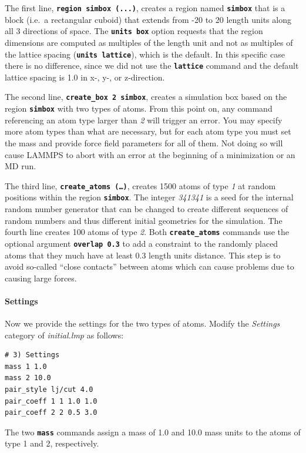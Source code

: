 \documentclass[9pt,tutorial]{livecoms}
\newcommand{\lmpcmd}[1]{\texttt{\normalsize\bfseries\textcolor{command}{#1}}}
\begin{document}
The first line, \lmpcmd{region simbox (...)}, creates a region
named \lmpcmd{simbox} that is a block (i.e.~a rectangular
cuboid) that extends from -20 to 20 length units along all 3 directions
of space.  The \lmpcmd{units box} option requests that the region
dimensions are computed as multiples of the length unit and not as
multiples of the lattice spacing (\lmpcmd{units lattice}), which is the
default.  In this specific case there is no difference, since we did not
use the \lmpcmd{lattice} command and the default lattice spacing is 1.0
in x-, y-, or z-direction.

The second line, \lmpcmd{create\_box 2 simbox}, creates a
simulation box based on the region \lmpcmd{simbox} with two
types of atoms.  From this point on, any command referencing an atom
type larger than \textit{2} will trigger an error.  You may specify more
atom types than what are necessary, but for each atom type you must set
the mass and provide force field parameters for all of them. Not doing
so will cause LAMMPS to abort with an error at the beginning of a
minimization or an MD run.

The third line, \lmpcmd{create\_atoms (\dots)}, creates 1500 atoms of type
\textit{1} at random positions within the region
\lmpcmd{simbox}.  The integer \textit{341341} is a seed for the
internal random number generator that can be changed to create different
sequences of random numbers and thus different initial geometries for
the simulation.  The fourth line creates 100 atoms of type \textit{2}.
Both \lmpcmd{create\_atoms} commands use the optional argument
\lmpcmd{overlap 0.3} to add a constraint to the randomly placed atoms
that they much have at least 0.3 length units distance.  This step is to
avoid so-called ``close contacts'' between atoms which can cause
problems due to causing large forces.

\paragraph{Settings}
Now we provide the settings for the two types of atoms.  Modify the
\textit{Settings} category of \textit{initial.lmp} as follows:
\begin{lstlisting}
# 3) Settings
mass 1 1.0
mass 2 10.0
pair_style lj/cut 4.0
pair_coeff 1 1 1.0 1.0
pair_coeff 2 2 0.5 3.0
\end{lstlisting}

The two \lmpcmd{mass} commands assign a mass of 1.0 and 10.0 mass units
to the atoms of type 1 and 2, respectively.
\end{document}
